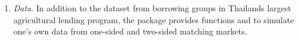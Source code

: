 \begin{enumerate}
\item \textit{Data}. In addition to the  dataset from borrowing groups in Thailands largest agricultural lending program, the package provides functions  and  to simulate one's own data from one-sided and two-sided matching markets. %
\end{enumerate}



\begin{comment}

\begin{table}
\centering
\small
\caption{Implemented full likelihood estimators for structural matching models}
\begin{tabular}{l|lllll}
\hline\hline
          &                &           & \multicolumn{3}{c}{Equilibrium assumptions} \\
\cline{4-6}
Market    & Functions      & Equations & Type 1         & Type 2                 & Type 3 \\
\hline
&&&&&\\
Two-sided & \code{stabit2} & matching  & Klein (2017)   & \multicolumn{1}{c}{--} & Logan et al.\ (2008)  \\
\cline{3-6}
          &                & selection & Klein (2017)   & Sorensen (2007)        & \multicolumn{1}{c}{--} \\
          &                &           &                & Park (2013)            &  \\
          &                &           &                & Chen (2013)            &  \\
\hline
&&&&&\\
One-sided & \code{stabit}  & selection & \multicolumn{1}{c}{--}& Klein (2015) & \multicolumn{1}{c}{--} \\
\hline\hline
\end{tabular}
\end{table}


\citet{Sorensen2007};
\citet{Chen2013}; 
\citet{Park2013};
\citet{Logan2008}



\end{comment}
